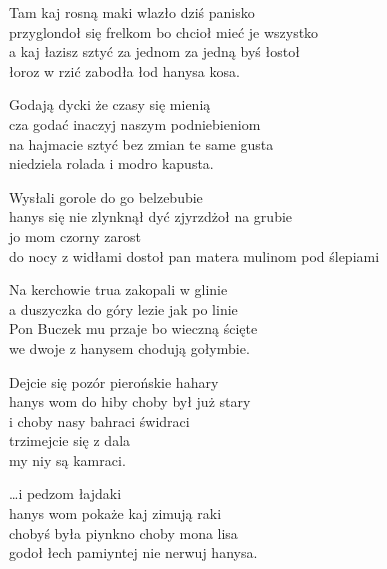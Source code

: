 \begin{text}
    Tam kaj rosną maki wlazło dziś panisko\\
    przyglondoł się frelkom bo chcioł mieć je wszystko\\
    a kaj łazisz sztyć za jednom za jedną byś łostoł\\
    łoroz w rzić zabodła łod hanysa kosa.

    Godają dycki że czasy się mienią\\
    cza godać inaczyj naszym podniebieniom\\
    na hajmacie sztyć bez zmian te same gusta\\
    niedziela rolada i modro kapusta.

    Wysłali gorole do go belzebubie\\
    hanys się nie zlynknął dyć zjyrzdżoł na grubie\\
    jo mom czorny zarost\\
    do nocy z widłami dostoł pan matera mulinom pod ślepiami

    Na kerchowie trua zakopali w glinie\\
    a duszyczka do góry lezie jak po linie\\
    Pon Buczek mu przaje bo wieczną ścięte\\
    we dwoje z hanysem chodują gołymbie.

    Dejcie się pozór pierońskie hahary\\
    hanys wom do hiby choby był już stary\\
    i choby nasy bahraci świdraci\\
    trzimejcie się z dala\\
    my niy są kamraci.

    …i pedzom łajdaki\\
    hanys wom pokaże kaj zimują raki\\
    chobyś była piynkno choby mona lisa\\
    godoł łech pamiyntej nie nerwuj hanysa.
\end{text}
\begin{chord}

\end{chord}
